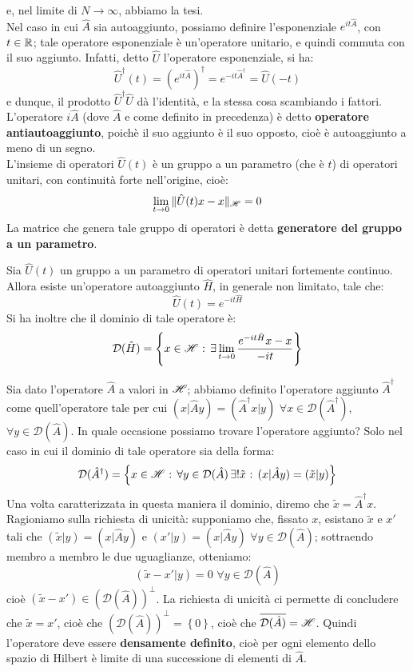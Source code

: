 e, nel limite di $N \to \infty$, abbiamo la tesi.\\
Nel caso in cui $\hat{A}$ sia autoaggiunto, possiamo definire l'esponenziale $e^{it\hat{A}}$, con $t \in \mathbb{R}$; tale operatore esponenziale è un'operatore unitario, e quindi commuta con il suo aggiunto. Infatti, detto $\hat{U}$ l'operatore esponenziale, si ha:
$$\hat{U}^{\dagger} (t)= \left(e^{it\hat{A}}\right)^{\dagger}=e^{-it\hat{A}^{\dagger}}=\hat{U}(-t)$$
e dunque, il prodotto $\hat{U}^{\dagger} \hat{U}$ dà l'identità, e la stessa cosa scambiando i fattori. L'operatore $i \hat{A}$ (dove $\hat{A}$ e come definito in precedenza) è detto \textbf{operatore antiautoaggiunto}, poichè il suo aggiunto è il suo opposto, cioè è autoaggiunto a meno di un segno.\\
L'insieme di operatori $\hat{U} (t)$ è un gruppo a un parametro (che è $t$) di operatori unitari, con continuità forte nell'origine, cioè:
$$\lim_{t \to 0} \| \hat{U}(t) x - x \|_{\mathscr{H}}=0$$
La matrice che genera tale gruppo di operatori è detta \textbf{generatore del gruppo a un parametro}.
\begin{teorema}
Sia $\hat{U} (t)$ un gruppo a un parametro di operatori unitari fortemente continuo. Allora esiste un'operatore autoaggiunto $\hat{H}$, in generale non limitato, tale che:
$$\hat{U}(t)=e^{-it \hat{H}}$$
Si ha inoltre che il dominio di tale operatore è:
$$\mathcal{D} (\hat{H})= \left\{x \in \mathscr{H} \text{ : } \exists \lim_{t \to 0} \frac{e^{-it\hat{H}} x - x}{-it} \right\}$$
\end{teorema}
Sia dato l'operatore $\hat{A}$ a valori in $\mathscr{H}$; abbiamo definito l'operatore aggiunto $\hat{A}^{\dagger}$ come quell'operatore tale per cui $(x|\hat{A}y)=(\hat{A}^{\dagger} x|y)$ $\forall x \in \mathcal{D}({\hat{A}^{\dagger}})$, $\forall y \in \mathcal{D}({\hat{A}})$. In quale occasione possiamo trovare l'operatore aggiunto? Solo nel caso in cui il dominio di tale operatore sia della forma:
$$\mathcal{D}({\hat{A}^{\dagger}})=\left\{ x \in \mathscr{H} \text{ : } \forall y \in \mathcal{D}({\hat{A}}) \, \exists ! \tilde{x} \text{ : } (x|\hat{A}y)=(\tilde{x}|y) \right\}$$
Una volta caratterizzata in questa maniera il dominio, diremo che $\tilde{x}=\hat{A}^{\dagger} x$.\\
Ragioniamo sulla richiesta di unicità: supponiamo che, fissato $x$, esistano $\tilde{x}$ e $x'$ tali che $(\tilde{x}|y)=(x|\hat{A}y)$ e $(x'|y)=(x|\hat{A}y)$ $\forall y \in \mathcal{D}(\hat{A})$; sottraendo membro a membro le due uguaglianze, otteniamo:
$$(\tilde{x} - x'|y)=0 \, \, \forall y \in \mathcal{D}(\hat{A})$$
cioè $(\tilde{x}-x') \in (\mathcal{D}(\hat{A}))^{\perp}$. La richiesta di unicità ci permette di concludere che $\tilde{x}=x'$, cioè che $(\mathcal{D}(\hat{A}))^{\perp} = \left\{0\right\}$, cioè che $\overline{\mathcal{D}(\hat{A})}= \mathscr{H}$. Quindi l'operatore deve essere \textbf{densamente definito}, cioè per ogni elemento dello spazio di Hilbert è limite di una successione di elementi di $\hat{A}$.\\
